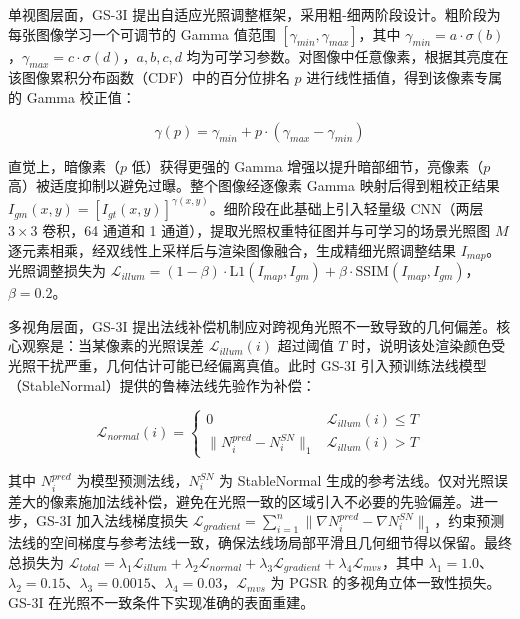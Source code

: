 单视图层面，GS-3I 提出自适应光照调整框架，采用粗-细两阶段设计。粗阶段为每张图像学习一个可调节的 Gamma 值范围 $[\gamma_{min}, \gamma_{max}]$，其中 $\gamma_{min} = a \cdot \sigma(b)$，$\gamma_{max} = c \cdot \sigma(d)$，$a, b, c, d$ 均为可学习参数。对图像中任意像素，根据其亮度在该图像累积分布函数（CDF）中的百分位排名 $p$ 进行线性插值，得到该像素专属的 Gamma 校正值：

\begin{equation}
\gamma(p) = \gamma_{min} + p \cdot (\gamma_{max} - \gamma_{min})
\end{equation}

直觉上，暗像素（$p$ 低）获得更强的 Gamma 增强以提升暗部细节，亮像素（$p$ 高）被适度抑制以避免过曝。整个图像经逐像素 Gamma 映射后得到粗校正结果 $I_{gm}(x,y) = [I_{gt}(x,y)]^{\gamma(x,y)}$。细阶段在此基础上引入轻量级 CNN（两层 $3\times3$ 卷积，64 通道和 1 通道），提取光照权重特征图并与可学习的场景光照图 $M$ 逐元素相乘，经双线性上采样后与渲染图像融合，生成精细光照调整结果 $I_{map}$。光照调整损失为 $\mathcal{L}_{illum} = (1-\beta) \cdot \text{L1}(I_{map}, I_{gm}) + \beta \cdot \text{SSIM}(I_{map}, I_{gm})$，$\beta = 0.2$。

多视角层面，GS-3I 提出法线补偿机制应对跨视角光照不一致导致的几何偏差。核心观察是：当某像素的光照误差 $\mathcal{L}_{illum}(i)$ 超过阈值 $T$ 时，说明该处渲染颜色受光照干扰严重，几何估计可能已经偏离真值。此时 GS-3I 引入预训练法线模型（StableNormal）提供的鲁棒法线先验作为补偿：

\begin{equation}
\mathcal{L}_{normal}(i) = \begin{cases} 0 & \mathcal{L}_{illum}(i) \leq T \\ \|N_i^{pred} - N_i^{SN}\|_1 & \mathcal{L}_{illum}(i) > T \end{cases}
\end{equation}

其中 $N_i^{pred}$ 为模型预测法线，$N_i^{SN}$ 为 StableNormal 生成的参考法线。仅对光照误差大的像素施加法线补偿，避免在光照一致的区域引入不必要的先验偏差。进一步，GS-3I 加入法线梯度损失 $\mathcal{L}_{gradient} = \sum_{i=1}^{n} \|\nabla N_i^{pred} - \nabla N_i^{SN}\|_1$，约束预测法线的空间梯度与参考法线一致，确保法线场局部平滑且几何细节得以保留。最终总损失为 $\mathcal{L}_{total} = \lambda_1 \mathcal{L}_{illum} + \lambda_2 \mathcal{L}_{normal} + \lambda_3 \mathcal{L}_{gradient} + \lambda_4 \mathcal{L}_{mvs}$，其中 $\lambda_1 = 1.0$、$\lambda_2 = 0.15$、$\lambda_3 = 0.0015$、$\lambda_4 = 0.03$，$\mathcal{L}_{mvs}$ 为 PGSR 的多视角立体一致性损失。GS-3I 在光照不一致条件下实现准确的表面重建。

